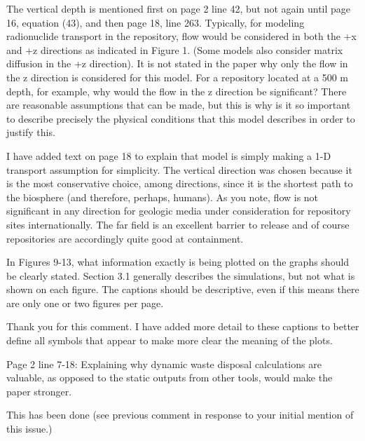 \documentclass[answers,12pt]{exam}
\begin{document}
\begin{questions}
\question The  vertical  depth  is  mentioned  first  on  page  2  line  42,  
but  not  again  until  page  16,  equation  (43),  and  then page  18,  line  
263.  Typically,  for  modeling  radionuclide  transport  in  the repository, 
flow would be considered in  both  the  +x  and  +z  directions as indicated in 
Figure 1. (Some models also consider matrix diffusion in the +z  direction).  
It  is  not  stated  in  the  paper  why  only  the  flow  in  the  z  
direction  is  considered  for this model.  For  a  repository  located  at  a  
500  m  depth,  for  example, why would the flow in the z direction be 
significant?  There  are reasonable assumptions that can be made, but this is 
why is it so important to describe precisely the physical conditions that this 
model describes in order to justify this.  \begin{solution}
I have added text on page 18 to explain that model is simply making a 1-D 
        transport assumption for simplicity. The vertical direction was chosen
        because it is the most conservative choice, among directions, since it 
        is the shortest path to the biosphere (and therefore, perhaps, humans).  
        As you note, flow is not significant in any direction for geologic 
        media under consideration for repository sites internationally. The far 
        field is an excellent barrier to release and of course repositories are 
        accordingly quite good at containment.
\end{solution} 

 
\question In  Figures  9-13,  what  information  exactly  is  being  plotted  
on  the  graphs should be clearly stated. Section 3.1 generally  describes  the  
simulations, but not what is shown on each figure. The captions should be 
descriptive, even if this means there are only one or two figures per page.  
\begin{solution}
Thank you for this comment. I  have added more detail to these captions to 
        better define all symbols that appear to make more clear the meaning of 
        the plots.
\end{solution} 
 
\question Page  2  line  7-18:  Explaining  why  dynamic  waste  disposal  
calculations  are  valuable,  as  opposed  to  the static outputs from other 
tools, would make the paper stronger.  \begin{solution}
        This has been done (see previous comment in response to your initial 
        mention of this issue.)
\end{solution} 


\end{questions}
\end{document}
